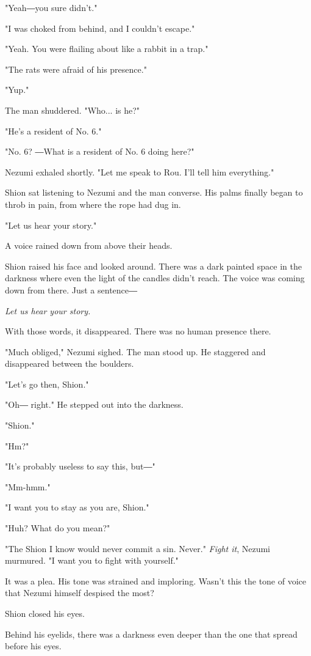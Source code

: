"Yeah―you sure didn't."

"I was choked from behind, and I couldn't escape."

"Yeah. You were flailing about like a rabbit in a trap."

"The rats were afraid of his presence."

"Yup."

The man shuddered. "Who... is he?"

"He's a resident of No. 6."

"No. 6? ―What is a resident of No. 6 doing here?"

Nezumi exhaled shortly. "Let me speak to Rou. I'll tell him everything."

Shion sat listening to Nezumi and the man converse. His palms finally
began to throb in pain, from where the rope had dug in.

"Let us hear your story."

A voice rained down from above their heads.

Shion raised his face and looked around. There was a dark painted space
in the darkness where even the light of the candles didn't reach. The
voice was coming down from there. Just a sentence―

\emph{Let us hear your story.}

With those words, it disappeared. There was no human presence there.

"Much obliged," Nezumi sighed. The man stood up. He staggered and
disappeared between the boulders.

"Let's go then, Shion."

"Oh― right." He stepped out into the darkness.

"Shion."

"Hm?"

"It's probably useless to say this, but―"

"Mm-hmm."

"I want you to stay as you are, Shion."

"Huh? What do you mean?"

"The Shion I know would never commit a sin. Never." \emph{Fight it}, Nezumi
murmured. "I want you to fight with yourself."

It was a plea. His tone was strained and imploring. Wasn't this the tone
of voice that Nezumi himself despised the most?

Shion closed his eyes.

Behind his eyelids, there was a darkness even deeper than the one that
spread before his eyes.